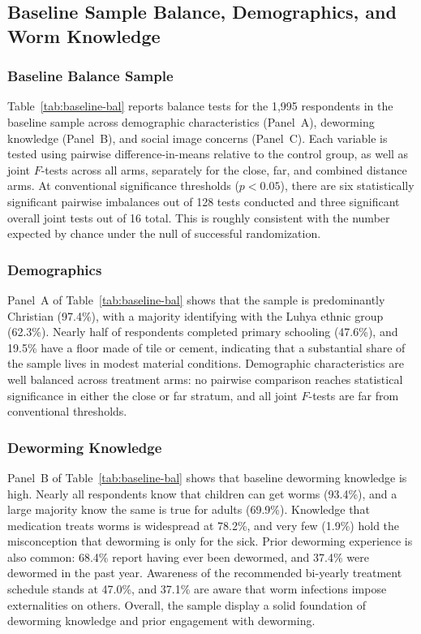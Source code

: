 \documentclass[12pt,a4paper]{article}
\begin{document}
\FloatBarrier
\subsection{Baseline Sample Balance, Demographics, and Worm Knowledge}\label{app:baseline-sample}


\subsubsection{Baseline Balance Sample}
Table~\ref{tab:baseline-bal} reports balance tests for the 1,995 respondents in the baseline sample across demographic characteristics (Panel~A), deworming knowledge (Panel~B), and social image concerns (Panel~C). Each variable is tested using pairwise difference-in-means relative to the control group, as well as joint $F$-tests across all arms, separately for the close, far, and combined  distance arms. At conventional significance thresholds ($p < 0.05$), there are six statistically significant pairwise imbalances out of 128 tests conducted and three significant overall joint tests out of 16 total. This is roughly consistent with the number expected by chance under the null of successful randomization.

\subsubsection{Demographics}
Panel~A of Table~\ref{tab:baseline-bal} shows that the sample is predominantly Christian (97.4\%), with a majority identifying with the Luhya ethnic group (62.3\%). Nearly half of respondents completed primary schooling (47.6\%), and 19.5\% have a floor made of tile or cement, indicating that a substantial share of the sample lives in modest material conditions. Demographic characteristics are well balanced across treatment arms: no pairwise comparison reaches statistical significance in either the close or far stratum, and all joint $F$-tests are far from conventional thresholds.

\subsubsection{Deworming Knowledge}
Panel~B of Table~\ref{tab:baseline-bal} shows that baseline deworming knowledge is high. Nearly all respondents know that children can get worms (93.4\%), and a large majority know the same is true for adults (69.9\%). Knowledge that medication treats worms is widespread at 78.2\%, and very few (1.9\%) hold the misconception that deworming is only for the sick. Prior deworming experience is also common: 68.4\% report having ever been dewormed, and 37.4\% were dewormed in the past year. Awareness of the recommended bi-yearly treatment schedule stands at 47.0\%, and 37.1\% are aware that worm infections impose externalities on others. Overall, the sample display a solid foundation of deworming knowledge and prior engagement with deworming.
\end{document}
